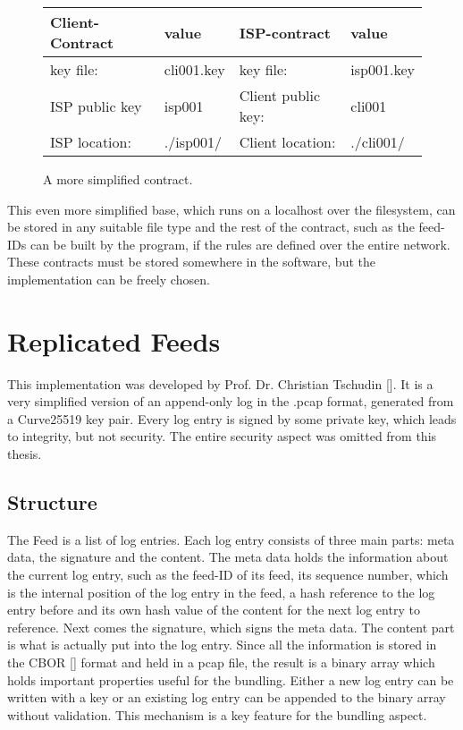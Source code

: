 \begin{figure}
    
    \begin{center}  
        \begin{tabular}{llll} \toprule
            Client-Contract&value&ISP-contract&value\\ \midrule
            key file:& cli001.key &  key file: &isp001.key  \\ 
            ISP public key&isp001&Client public key:&cli001\\
            ISP location:&.\slash isp001\slash &Client location:& .\slash cli001\slash \\\bottomrule
        \end{tabular}  
    \end{center}
    \caption{A more simplified contract.}
\end{figure}
This even more simplified base, which runs on a localhost over the filesystem, can be stored in any suitable file type and the rest of the contract, such as the feed-IDs can be built by the program, if the rules are defined over the entire network. These contracts must be stored somewhere in the software, but the implementation can be freely chosen.

\section{Replicated Feeds}
This implementation was developed by Prof. Dr. Christian Tschudin []. It is a very simplified version of an append-only log in the .pcap format, generated from a Curve25519 key pair. Every log entry is signed by some private key, which leads to integrity, but not security. The entire security aspect was omitted from this thesis.
\subsection{Structure}
The Feed is a list of log entries. Each log entry consists of three main parts: meta data, the signature and the content. The meta data holds the information about the current log entry, such as the feed-ID of its feed, its sequence number, which is the internal position of the log entry in the feed, a hash reference to the log entry before and its own hash value of the content for the next log entry to reference. Next comes the signature, which signs the meta data. The content part is what is actually put into the log entry. Since all the information is stored in the CBOR [] format and held in a pcap file, the result is a binary array which holds important properties useful for the bundling. Either a new log entry can be written with a key or an existing log entry can be appended to the binary array without validation. This mechanism is a key feature for the bundling aspect.

